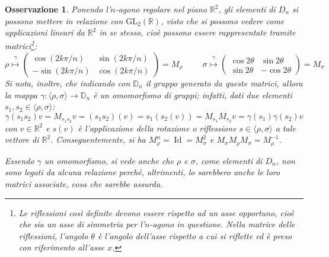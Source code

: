 \documentclass[12pt]{scrartcl}
\theoremstyle{style}
\newtheorem{osservazione}{Osservazione}[section]
\numberwithin{equation}{subsection}
\begin{document}
\begin{osservazione}
	Ponendo l'$n$-agono regolare nel piano $\mathbb{R}^2$, gli elementi di $D_n$ si possono mettere in relazione con $\mathrm{GL} _2(\mathbb{R})$, visto che si possono vedere come applicazioni lineari da $\mathbb{R}^2$ in se stesso, cio\`e possono essere rappresentate tramite matrici\footnote{Le riflessioni cos\`i definite devono essere rispetto ad un asse opportuno, cio\`e che sia un asse di simmetria per l'$n$-agono in questione. Nella matrice delle riflessioni, l'angolo $\theta $ \`e l'angolo dell'asse rispetto a cui si riflette ed \`e preso con riferimento all'asse $x$.}:
\begin{equation*}
	\rho  \stackrel{\gamma}{\longmapsto} \begin{pmatrix} \displaystyle \cos \left(2k\pi / n\right) & \sin \left(2k\pi / n\right) \\ - \sin \left( 2k\pi / n\right) & \cos (2k\pi / n) \end{pmatrix}=M_\rho  \hspace{1cm}\sigma \stackrel{\gamma}{\longmapsto} \begin{pmatrix} \cos 2 \theta  & \sin 2\theta  \\ \sin 2\theta  & - \cos 2\theta  \end{pmatrix} = M_\sigma 
\end{equation*}
Si nota, inoltre, che indicando con $\mathbb{D}_n$ il gruppo generato da queste matrici, allora la mappa $\gamma : \langle \rho ,\sigma  \rangle\to \mathbb{D}_n$ \`e un omomorfismo di gruppi; infatti, dati due elementi $s_1,s_2 \in \langle \rho ,\sigma  \rangle$:
\[
\gamma(s_1s_2)v= M_{s_1s_2} v = (s_1s_2) (v) = s_1 (s_2 (v)) =M_{s_1} M_{s_2} v = \gamma(s_1)\gamma(s_2)v
\] 
con $v \in \mathbb{R}^2$ e $s(v)$ \`e l'applicazione della rotazione o riflessione $s \in \langle \rho ,\sigma  \rangle$ a tale vettore di $\mathbb{R}^2$.
Conseguentemente, si ha $M_\rho ^n = \operatorname{Id}=M_\sigma ^2 $ e $M_\sigma M_\rho M_\sigma = M_\rho ^{-1}$.

Essendo $\gamma$ un omomorfismo, si vede anche che $\rho $ e $\sigma $, come elementi di $D_n$, non sono legati da alcuna relazione perch\'e, altrimenti, lo sarebbero anche le loro matrici associate, cosa che sarebbe assurda. 
\end{osservazione}
\end{document}

